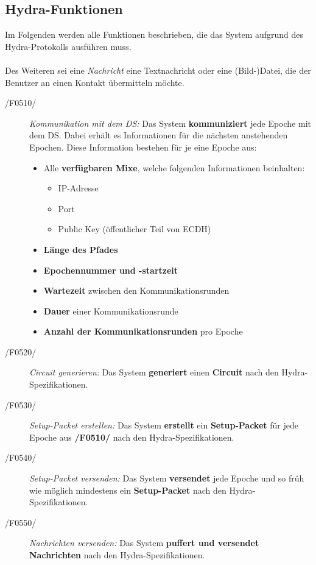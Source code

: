 \subsection{Hydra-Funktionen}
Im Folgenden werden alle Funktionen beschrieben, die das System aufgrund des Hydra-Protokolls ausführen muss.\\
\\
Des Weiteren sei eine \textit{Nachricht} eine Textnachricht oder eine (Bild-)Datei, die der Benutzer an einen Kontakt übermitteln möchte.
	\begin{description}
		\item[/F0510/]
			\textit{Kommunikation mit dem \ac{DS}:}
			Das System \textbf{kommuniziert} jede Epoche mit dem \ac{DS}.
			Dabei erhält es Informationen für die nächsten anstehenden Epochen.
			Diese Information bestehen für je eine Epoche aus:
			\begin{itemize}
				\item
					Alle \textbf{verfügbaren Mixe}, welche folgenden Informationen beinhalten:
					\begin{itemize}
						\item
							IP-Adresse
						\item
							Port
						\item
							Public Key (öffentlicher Teil von \ac{ECDH})
					\end{itemize}
				\item 
					\textbf{Länge des Pfades}
				\item 
					\textbf{Epochennummer und -startzeit}
				\item 
					\textbf{Wartezeit} zwischen den Kommunikationsrunden
				\item
					\textbf{Dauer} einer Kommunikationsrunde
				\item 
					\textbf{Anzahl der Kommunikationsrunden} pro Epoche
			\end{itemize}
		\item[/F0520/]
			\textit{Circuit generieren:} 
			Das System \textbf{generiert} einen \textbf{Circuit} nach den Hydra-Spezifikationen.
		\item[/F0530/]
			\textit{Setup-Packet erstellen:} 
			Das System \textbf{erstellt} ein \textbf{Setup-Packet} für jede Epoche aus \textbf{/F0510/} nach den Hydra-Spezifikationen.
		\item[/F0540/]
			\textit{Setup-Packet versenden:}
			Das System \textbf{versendet} jede Epoche und so früh wie möglich mindestens ein \textbf{Setup-Packet} nach den Hydra-Spezifikationen.
		\item[/F0550/]
			\textit{Nachrichten versenden:} 
			Das System \textbf{puffert und versendet Nachrichten} nach den Hydra-Spezifikationen.
	\end{description}
	
